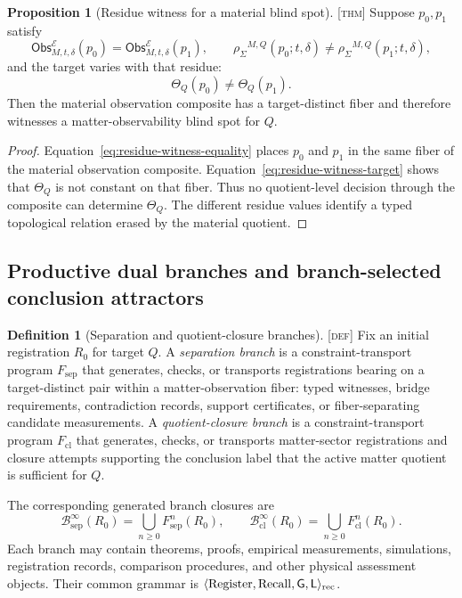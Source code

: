 \documentclass[11pt]{article}
\newcommand{\Register}{\ensuremath{\operatorname{Register}}}
\newcommand{\Recall}{\ensuremath{\operatorname{Recall}}}
\newcommand{\GOp}{\ensuremath{\mathsf{G}}}
\newcommand{\LOp}{\ensuremath{\mathsf{L}}}
\newcommand{\ObsMap}{\ensuremath{\mathsf{Obs}}}
\newcommand{\SyncRes}{\ensuremath{\rho_{\Sigma}}}
\newcommand{\Defn}{\textsc{[def]}}
\newcommand{\Thm}{\textsc{[thm]}}
\theoremstyle{definition}
\newtheorem{sdefinition}{Definition}
\newtheorem{sproposition}{Proposition}
\begin{document}
\begin{sproposition}[Residue witness for a material blind spot]
\label{prop:residue-blindspot-witness}
\Thm{} Suppose $p_0,p_1$ satisfy
\begin{equation}
\ObsMap^{\mathcal E}_{M,t,\delta}(p_0)=
\ObsMap^{\mathcal E}_{M,t,\delta}(p_1),
\qquad
\SyncRes^{M,Q}(p_0;t,\delta)\neq
\SyncRes^{M,Q}(p_1;t,\delta),
\label{eq:residue-witness-equality}
\end{equation}
and the target varies with that residue:
\begin{equation}
\Theta_Q(p_0)\neq\Theta_Q(p_1).
\label{eq:residue-witness-target}
\end{equation}
Then the material observation composite has a target-distinct fiber and therefore
witnesses a matter-observability blind spot for $Q$.
\end{sproposition}

\begin{proof}
Equation~\eqref{eq:residue-witness-equality} places $p_0$ and $p_1$ in the same
fiber of the material observation composite. Equation~\eqref{eq:residue-witness-target}
shows that $\Theta_Q$ is not constant on that fiber. Thus no quotient-level
decision through the composite can determine $\Theta_Q$. The different residue
values identify a typed topological relation erased by the material quotient.
\end{proof}

\subsection{Productive dual branches and branch-selected conclusion attractors}

\begin{sdefinition}[Separation and quotient-closure branches]
\label{def:matter-dual-branches}
\Defn{} Fix an initial registration $R_0$ for target $Q$. A \emph{separation
branch} is a constraint-transport program $F_{\mathrm{sep}}$ that generates,
checks, or transports registrations bearing on a target-distinct pair within a
matter-observation fiber: typed witnesses, bridge requirements, contradiction
records, support certificates, or fiber-separating candidate measurements. A
\emph{quotient-closure branch} is a constraint-transport program
$F_{\mathrm{cl}}$ that generates, checks, or transports matter-sector
registrations and closure attempts supporting the conclusion label that the active
matter quotient is sufficient for $Q$.

The corresponding generated branch closures are
\begin{equation}
\mathcal B^{\infty}_{\mathrm{sep}}(R_0)=
\bigcup_{n\geq0}F_{\mathrm{sep}}^n(R_0),
\qquad
\mathcal B^{\infty}_{\mathrm{cl}}(R_0)=
\bigcup_{n\geq0}F_{\mathrm{cl}}^n(R_0).
\label{eq:matter-dual-branches}
\end{equation}
Each branch may contain theorems, proofs, empirical measurements, simulations,
registration records, comparison procedures, and other physical assessment
objects. Their common grammar is $\langle\Register,\Recall,\GOp,\LOp\rangle_{\rm rec}$.
\end{sdefinition}
\end{document}
